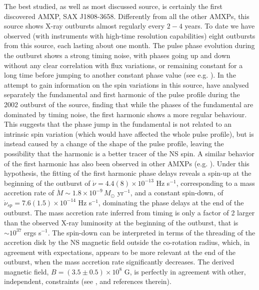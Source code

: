 \documentclass[graybox]{svmult}
\begin{document}
The best studied, as well as most discussed source, is certainly the first discovered AMXP, SAX J1808-3658. Differently from all the other AMXPs, this source shows X-ray outbursts almost regularly every $2-4$ years. To date we have observed (with instruments with high-time resolution capabilities) eight outbursts from this source, each lasting about one month. The pulse phase evolution during the outburst shows a strong timing noise, with phases going up and down without any clear correlation with flux variations, or remaining constant for a long time before jumping to another constant phase value (see e.g. \cite{Hartman2008,Hartman2009a, Hartman2009b}). In the attempt to gain information on the spin variations in this source, \cite{Burderi2006} have analysed separately the fundamental and first harmonic of the pulse profile during the 2002 outburst of the source, finding that while the phases of the fundamental are dominated by timing noise, the first harmonic shows a more regular behaviour. This suggests that the phase jump in the fundamental is not related to an intrinsic spin variation (which would have affected the whole pulse profile), but is instead caused by a change of the shape of the pulse profile, leaving the possibility that the harmonic is a better tracer of the NS spin. A similar behavior of the first harmonic has also been observed in other AMXPs (e.g. \cite{Riggio2008,Riggio2011,Papitto2012}).  Under this hypothesis, the fitting of the first harmonic phase delays reveals a spin-up at the beginning of the outburst of $\dot \nu = 4.4(8) \times 10^{-13}$ Hz s$^{-1}$, corresponding to a mass accretion rate of $\dot M \sim 1.8 \times 10^{-9}\, M_\odot$ yr$^{-1}$, and a constant spin-down, of $\dot \nu_{sp} = 7.6(1.5) \times 10^{-14}$ Hz s$^{-1}$, dominating the phase delays at the end of the outburst. The mass accretion rate inferred from timing is only a factor of 2 larger than the observed X-ray luminosity at the beginning of the outburst, that is $\sim 10^{37}$ ergs s$^{-1}$. The spin-down can be interpreted in terms of the threading of the accretion disk by the NS magnetic field outside the co-rotation radius, which, in agreement with expectations, appears to be more relevant at the end of the outburst, when the mass accretion rate significantly decreases. The derived magnetic field, $B = (3.5 \pm 0.5) \times 10^8$ G, is perfectly in agreement with other, independent, constraints (see \cite{Burderi2006}, and references therein).
\end{document}
